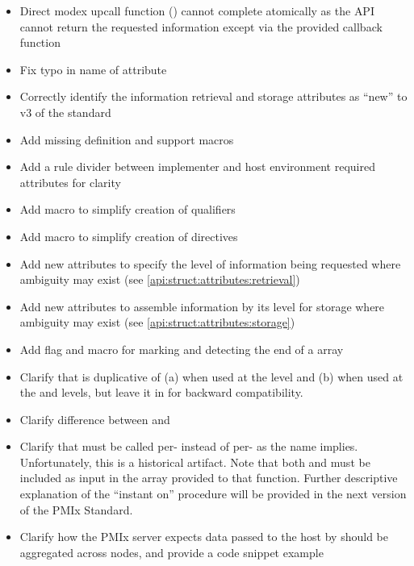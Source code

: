\begin{itemize}
    \item Direct modex upcall function () cannot complete atomically as the \ac{API} cannot return the requested information except via the provided callback function
    \item Fix typo in name of  attribute
    \item Correctly identify the information retrieval and storage attributes as ``new'' to v3 of the standard
    \item Add missing  definition and support macros
    \item Add a rule divider between implementer and host environment required attributes for clarity
    \item Add  macro to simplify creation of  qualifiers
    \item Add  macro to simplify creation of  directives
    \item Add new attributes to specify the level of information being requested where ambiguity may exist (see \ref{api:struct:attributes:retrieval})
    \item Add new attributes to assemble information by its level for storage where ambiguity may exist (see \ref{api:struct:attributes:storage})
    \item Add flag and  macro for marking and detecting the end of a  array
    \item Clarify that  is duplicative of (a)  when used at the  level and (b)  when used at the  and  levels, but leave it in for backward compatibility.
    \item Clarify difference between  and 
    \item Clarify that  must be called per- instead of per- as the name implies. Unfortunately, this is a historical artifact. Note that both  and  must be included as input in the  array provided to that function. Further descriptive explanation of the ``instant on'' procedure will be provided in the next version of the \ac{PMIx} Standard.
    \item Clarify how the \ac{PMIx} server expects data passed to the host by  should be aggregated across nodes, and provide a code snippet example
\end{itemize}



